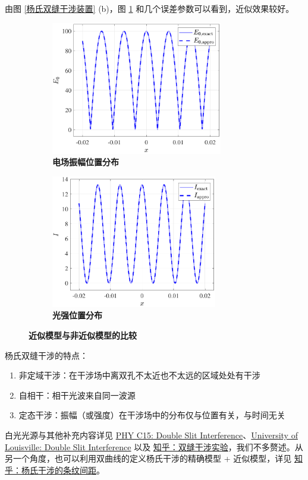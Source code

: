 \documentclass[UTF8]{report}
\theoremstyle{MyLineTheoremStyle} %
\theoremstyle{MyBlockTheoremStyle} %
\theoremstyle{MySubsubsectionStyle} %
\begin{document}
由图 \ref{杨氏双缝干涉装置} (b)，图 \ref{近似模型与非近似模型的比较} 和几个误差参数可以看到，近似效果较好。

\begin{figure}[H]\centering
\begin{subfigure}[t]{0.5\columnwidth}\centering
    \includegraphics[height=165pt]{assets/3/杨电场.pdf}
    \caption{\bfseries 电场振幅位置分布 }
\end{subfigure}\hfill
\begin{subfigure}[t]{0.5\columnwidth}\centering
    \includegraphics[height=165pt]{assets/3/杨光强.pdf}
    \caption{\bfseries 光强位置分布 }
\end{subfigure}
\caption{\bfseries 近似模型与非近似模型的比较 }\label{近似模型与非近似模型的比较}
\end{figure}

\noindent 杨氏双缝干涉的特点：
\begin{enumerate}
\item 非定域干涉：在干涉场中离双孔不太近也不太远的区域处处有干涉
\item 自相干：相干光波来自同一波源
\item 定态干涉：振幅（或强度）在干涉场中的分布仅与位置有关，与时间无关
\end{enumerate}


白光光源与其他补充内容详见 \href{https://produckthieves.home.blog/2020/02/10/phy-c15-double-slit-interference/}{PHY C15: Double Slit Interference}、\href{https://www.physics.louisville.edu/cldavis/phys299/notes/lo_interference.html}{University of Louisville: Double Slit Interference} 以及 \href{https://zhuanlan.zhihu.com/p/335815195}{知乎：双缝干涉实验}，我们不多赘述。从另一个角度，也可以利用双曲线的定义杨氏干涉的精确模型 + 近似模型，详见 \href{https://www.zhihu.com/question/382600481/answer/2565939868}{知乎：杨氏干涉的条纹间距}。
\end{document}
